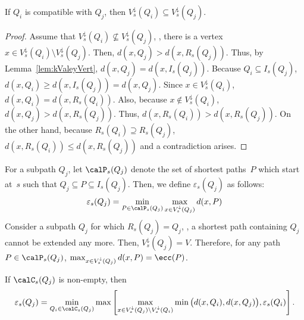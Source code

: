 \begin{lemma}
    \label{lem:kValeyVertSubset}
If \( Q_{i} \) is compatible with \( Q_j \), then \( V^\downarrow_s(Q_{i}) \subseteq V^\downarrow_s(Q_j) \).
\end{lemma}

\begin{proof}
Assume that $V^\downarrow_s(Q_{i}) \nsubseteq V^\downarrow_s(Q_j)$, \ie, there is a vertex~$x \in V^\downarrow_s(Q_{i}) \setminus V^\downarrow_s(Q_j)$.
Then, $d(x, Q_j) > d(x, R_s(Q_j))$.
Thus, by Lemma~\ref{lem:kValeyVert}, $d(x, Q_j) = d(x, I_s(Q_j))$.
Because $Q_{i} \subseteq I_s(Q_j)$, $d(x, Q_{i}) \geq d(x, I_s(Q_j)) = d(x, Q_j)$.
Since $x \in V^\downarrow_s(Q_{i})$, $d(x, Q_{i}) = d(x, R_s(Q_{i}))$.
Also, because $x \notin V^\downarrow_s(Q_{i})$, $d(x, Q_j) > d(x, R_s(Q_j))$.
Thus, $d(x, R_s(Q_{i})) > d(x, R_s(Q_j))$.
On the other hand, because $R_s(Q_{i}) \supseteq R_s(Q_j)$, $d(x, R_s(Q_{i})) \leq d(x, R_s(Q_j))$ and a contradiction arises.
\end{proof}

For a subpath $Q_j$, let $\calP_s(Q_j)$ denote the set of shortest paths~$P$ which start at~$s$ such that $Q_j \subseteq P \subseteq I_s(Q_j)$.
Then, we define $\varepsilon_s(Q_j)$ as follows:
\[
    \varepsilon_s(Q_j) = \min_{P \in \calP_s(Q_j)} \max_{x \in V^\downarrow_s(Q_j)} d(x, P)
\]
Consider a subpath $Q_j$ for which $R_s(Q_j) = Q_j$, \ie, a shortest path containing $Q_j$ cannot be extended any more.
Then, $V^\downarrow_s(Q_j) = V$.
Therefore, for any path $P \in \calP_s(Q_j)$, $\max_{x \in V^\downarrow_s(Q_j)} d(x, P) = \ecc(P)$.

\begin{lemma}
    \label{lem:valEpsilon}
If \( \calC_s(Q_j) \) is non-empty, then
\[
    \varepsilon_s(Q_j)
    =
    \min_{Q_{i} \in \calC_s(Q_j)} \max \left[
        \max_{x \in V^\downarrow_s(Q_j) \setminus V^\downarrow_s(Q_{i})} \min \big( d(x, Q_{i}), d(x, Q_{j}) \big),
        \varepsilon_s(Q_{i})
    \right].
\]
\end{lemma}

